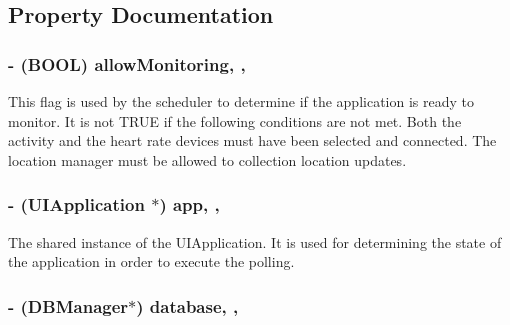 \subsection{Property Documentation}
\hypertarget{interface_background_scheduler_a5209bb2a1aa5fe8eeac8f89977252df7}{
\subsubsection[{allow\-Monitoring}]{\setlength{\rightskip}{0pt plus 5cm}-\/ (B\-O\-O\-L) allow\-Monitoring\hspace{0.3cm}{\ttfamily [read]}, {\ttfamily [write]}, {\ttfamily [atomic]}}}\label{interface_background_scheduler_a5209bb2a1aa5fe8eeac8f89977252df7}
This flag is used by the scheduler to determine if the application is ready to monitor. It is not T\-R\-U\-E if the following conditions are not met. Both the activity and the heart rate devices must have been selected and connected. The location manager must be allowed to collection location updates. \hypertarget{interface_background_scheduler_a8c133b6375de7c3e0cda3ac605ad2029}{
\subsubsection[{app}]{\setlength{\rightskip}{0pt plus 5cm}-\/ (U\-I\-Application $\ast$) app\hspace{0.3cm}{\ttfamily [read]}, {\ttfamily [atomic]}, {\ttfamily [assign]}}}\label{interface_background_scheduler_a8c133b6375de7c3e0cda3ac605ad2029}
The shared instance of the U\-I\-Application. It is used for determining the state of the application in order to execute the polling. \hypertarget{interface_background_scheduler_a6cacd8a0d6d25475816490b39dcf35d3}{
\subsubsection[{database}]{\setlength{\rightskip}{0pt plus 5cm}-\/ ({\bf D\-B\-Manager}$\ast$) database\hspace{0.3cm}{\ttfamily [read]}, {\ttfamily [write]}, {\ttfamily [atomic]}}}\label{interface_background_scheduler_a6cacd8a0d6d25475816490b39dcf35d3}
